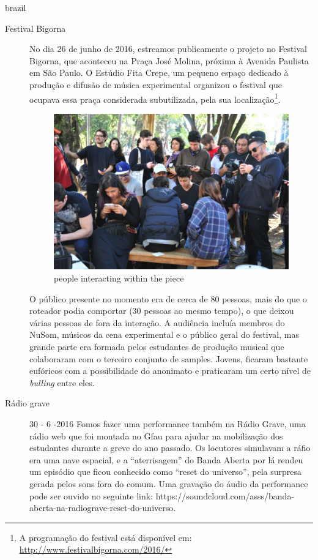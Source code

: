 \begin{otherlanguage*}{brazil}
\begin{description}
\item[Festival Bigorna]
No dia 26 de junho de 2016, estreamos publicamente o projeto no Festival Bigorna, que aconteceu na Praça José Molina, próxima à Avenida Paulista em São Paulo. O Estúdio Fita Crepe, um pequeno espaço dedicado à produção e difusão de música experimental organizou o festival que ocupava essa praça considerada subutilizada, pela sua localização\footnote{A programação do festival está disponível em: \url{http://www.festivalbigorna.com/2016/}}.

\begin{figure}[!ht]
	\centering
		\includegraphics[width=1\textwidth]{pictures/bigorna}
		\vspace{-10pt}
	\caption{people interacting within the piece}
    \label{fig:performer}
\end{figure}

O público presente no momento era de cerca de 80 pessoas, mais do que o roteador podia comportar (30 pessoas ao mesmo tempo), o que deixou várias pessoas de fora da interação. A audiência incluía membros do NuSom, músicos da cena experimental e o público geral do festival, mas grande parte era formada pelos estudantes de produção musical que colaboraram com o terceiro conjunto de samples. Jovens, ficaram bastante eufóricos com a possibilidade do anonimato e praticaram um certo nível de \emph{bulling} entre eles. 

\item[Rádio grave] 30 - 6 -2016
Fomos fazer uma performance também na Rádio Grave, uma rádio web que foi montada no Gfau para ajudar na mobilização dos  estudantes durante a greve do ano passado. Os locutores simulavam a ráfio era uma nave espacial, e a ``aterrisagem'' do Banda Aberta por lá rendeu um episódio que ficou conhecido como ``reset do universo'', pela surpresa gerada pelos sons fora do comum. Uma gravação do áudio da performance pode ser ouvido no seguinte link: https://soundcloud.com/asss/banda-aberta-na-radiograve-reset-do-universo.



\end{description}
\end{otherlanguage*}
